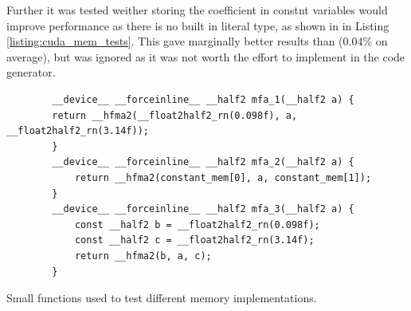 Further it was tested weither storing the coefficient in constnt variables would improve performance as there is no built in  literal type, as shown in  in Listing \ref{listing:cuda_mem_tests}.
This gave marginally better results than  (0.04\% on average), but was ignored as it was not worth the effort to implement in the code generator.

\begin{listing}[H]
    \begin{verbatim}
        __device__ __forceinline__ __half2 mfa_1(__half2 a) {
        return __hfma2(__float2half2_rn(0.098f), a, __float2half2_rn(3.14f));
        }
        __device__ __forceinline__ __half2 mfa_2(__half2 a) {
            return __hfma2(constant_mem[0], a, constant_mem[1]);
        }
        __device__ __forceinline__ __half2 mfa_3(__half2 a) {
            const __half2 b = __float2half2_rn(0.098f);
            const __half2 c = __float2half2_rn(3.14f);
            return __hfma2(b, a, c);
        }
    \end{verbatim}
    \caption{Small functions used to test different memory implementations.}
    \label{listing:cuda_mem_tests}
\end{listing}




